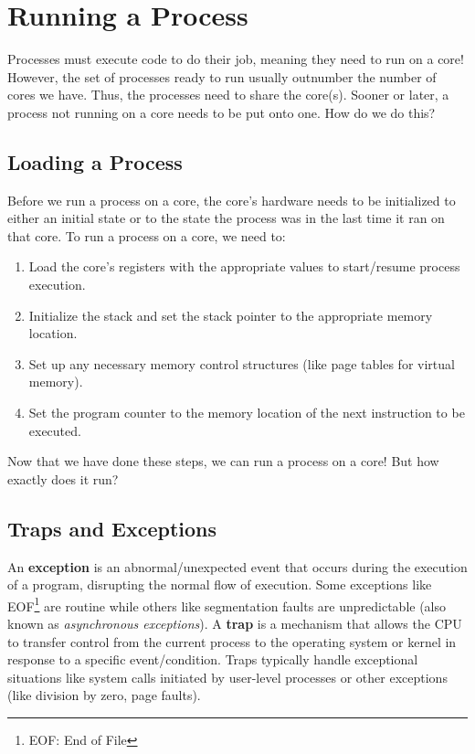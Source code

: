 \documentclass{report}
\newcommand{\definitionBegin}[1]{\begin{tcolorbox}[title={Definition: #1}]}
\newcommand{\definitionEnd}{\end{tcolorbox}}
\begin{document}
\section{Running a Process}
Processes must execute code to do their job, meaning they need to run on a core! However, the set of
processes ready to run usually outnumber the number of cores we have. Thus, the processes need to
share the core(s). Sooner or later, a process not running on a core needs to be put onto one. How do
we do this?


\subsection{Loading a Process}
Before we run a process on a core, the core's hardware needs to be initialized to either an initial state
or to the state the process was in the last time it ran on that core. To run a process on a core, we need to:
\begin{enumerate}[label=\textit{(\roman*)}]
\item Load the core's registers with the appropriate values to start/resume process execution.
\item Initialize the stack and set the stack pointer to the appropriate memory location.
\item Set up any necessary memory control structures (like page tables for virtual memory).
\item Set the program counter to the memory location of the next instruction to be executed.
\end{enumerate}
Now that we have done these steps, we can run a process on a core! But how exactly does it run?


\subsection{Traps and Exceptions}
\definitionBegin{Trap and Exception}
An \textbf{exception} is an abnormal/unexpected event that occurs during the execution of a program,
disrupting the normal flow of execution. Some exceptions like EOF\footnote{EOF: End of File} are
routine while others like segmentation faults are unpredictable (also known as \textit{asynchronous
  exceptions}). 
\tcblower
A \textbf{trap} is a mechanism that allows the CPU to transfer control from the current process to
the operating system or kernel in response to a specific event/condition. Traps typically handle
exceptional situations like system calls initiated by user-level processes or other exceptions (like
division by zero, page faults).
\definitionEnd
\end{document}
